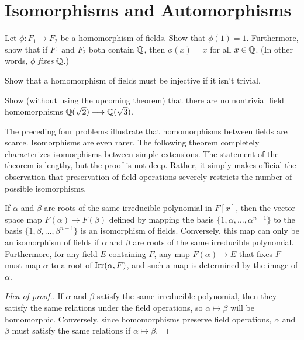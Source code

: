 \section{Isomorphisms and Automorphisms}

\begin{problem}
Let $\phi: F_1 \longrightarrow F_2$ be a homomorphism of fields. Show that $\phi(1) = 1$. Furthermore, show that if $F_1$ and $F_2$ both contain $\mathbb{Q}$, then $\phi(x) = x$ for all $x\in \mathbb{Q}$. (In other words, $\phi$ \textit{fixes} $\mathbb{Q}$.)
\end{problem}

\begin{problem}
Show that a homomorphism of fields must be injective if it isn't trivial.
\end{problem}

\begin{problem}
    Show (without using the upcoming theorem) that there are no nontrivial field homomorphisms $\mathbb{Q}(\sqrt{2}) \longrightarrow \mathbb{Q}(\sqrt{3})$.
\end{problem}

The preceding four problems illustrate that homomorphisms between fields are scarce. Isomorphisms are even rarer. The following theorem completely characterizes isomorphisms between simple extensions. The statement of the theorem is lengthy, but the proof is not deep. Rather, it simply makes official the observation that preservation of field operations severely restricts the number of possible isomorphisms.

\begin{theorem}\label{thm:conjiso}
If $\alpha$ and $\beta$ are roots of the same irreducible polynomial in $F[x]$, then the vector space map $F(\alpha) \longrightarrow F(\beta)$ defined by mapping the basis $\{1, \alpha, \ldots, \alpha^{n-1}\}$ to the basis $\{1, \beta, \ldots, \beta^{n-1}\}$ is an isomorphism of fields.  Conversely, this map can only be an isomorphism of fields if $\alpha$ and $\beta$ are roots of the same irreducible polynomial.  Furthermore, for any field $E$ containing $F$, any map $F(\alpha) \longrightarrow E$ that fixes $F$ must map $\alpha$ to a root of $\operatorname{Irr}(\alpha,F)$, and such a map is determined by the image of $\alpha$.
\end{theorem}

\begin{proof}[Idea of proof.] If $\alpha$ and $\beta$ satisfy the same irreducible polynomial, then they satisfy the same relations under the field operations, so $\alpha \mapsto \beta$ will be homomorphic. Conversely, since homomorphisms preserve field operations, $\alpha$ and $\beta$ must satisfy the same relations if $\alpha \mapsto \beta$.
\end{proof}

